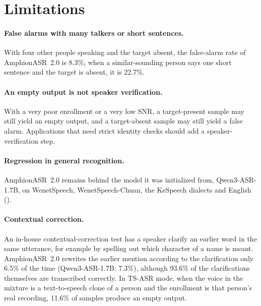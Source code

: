 
\section{Limitations}
\label{sec:limitations}

\paragraph{False alarms with many talkers or short sentences.}
With four other people speaking and the target absent, the false-alarm rate of AmphionASR~2.0 is 8.3\%; when a similar-sounding person says one short sentence and the target is absent, it is 22.7\%.

\paragraph{An empty output is not speaker verification.}
With a very poor enrollment or a very low SNR, a target-present sample may still yield an empty output, and a target-absent sample may still yield a false alarm.
Applications that need strict identity checks should add a speaker-verification step.

\paragraph{Regression in general recognition.}
AmphionASR~2.0 remains behind the model it was initialized from, Qwen3-ASR-1.7B, on WenetSpeech, WenetSpeech-Chuan, the KeSpeech dialects and English ().

\paragraph{Contextual correction.}
An in-house contextual-correction test has a speaker clarify an earlier word in the same utterance, for example by spelling out which character of a name is meant.
AmphionASR~2.0 rewrites the earlier mention according to the clarification only 6.5\% of the time (Qwen3-ASR-1.7B: 7.3\%), although 93.6\% of the clarifications themselves are transcribed correctly.
In TS-ASR mode, when the voice in the mixture is a text-to-speech clone of a person and the enrollment is that person's real recording, 11.6\% of samples produce an empty output.

